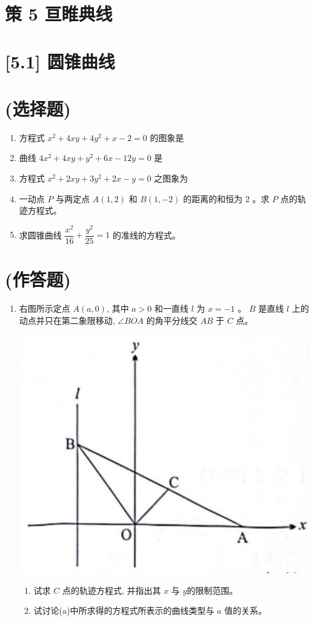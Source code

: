 \documentclass[10pt]{article}
\begin{document}
\section*{策 5 亘睢典线}
\section*{[5.1] 圆锥曲线}
\section*{(选择题)}
\begin{enumerate}
  \item 方程式 $x^{2}+4 x y+4 y^{2}+x-2=0$ 的图象是 
  \item 曲线 $4 x^{2}+4 x y+y^{2}+6 x-12 y=0$ 是 
  \item 方程式 $x^{2}+2 x y+3 y^{2}+2 x-y=0$ 之图象为 
  \item 一动点 $P$ 与两定点 $A(1,2)$ 和 $B(1,-2)$ 的距离的和恒为 2 。求 $P$ 点的轨迹方程式。
  \item 求圆锥曲线 $\dfrac{x^{2}}{16}+\dfrac{y^{2}}{25}=1$ 的准线的方程式。
\end{enumerate}

\section*{(作答题)}
\begin{enumerate}
  \item 右图所示定点 $A(a, 0)$, 其中 $a>0$ 和一直线 $l$ 为 $x=-1$ 。 $B$ 是直线 $l$ 上的动点并只在第二象限移动, $\angle BOA$ 的角平分线交 $AB$ 于 $C$ 点。
  \begin{center}
    \includegraphics[max width=\textwidth]{2024_06_05_971e6815482d5ecd2718g-26}
    \end{center}
  \begin{enumerate}
    \item 试求 $C$ 点的轨迹方程式, 并指出其 $x$ 与 $y$的限制范围。
    \item 试讨论(a)中所求得的方程式所表示的曲线类型与 $a$ 值的关系。
  \end{enumerate}
\end{enumerate}
\end{document}
